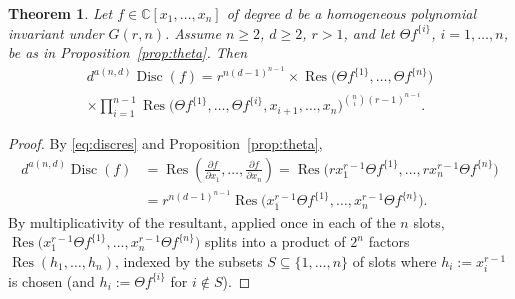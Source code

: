 \documentclass[12pt]{amsart}
\newtheorem{theorem}{Theorem}[section]
\theoremstyle{definition}
\newcommand{\Res}{\operatorname{Res}}
\newcommand{\Disc}{\operatorname{Disc}}
\begin{document}
\begin{theorem}
\label{thm:disc2}
Let $f \in \mathbb{C}[x_1,\dots,x_n]$ of degree $d$ be a homogeneous polynomial invariant under $G(r,n)$. Assume $n\geqslant 2$, $d\geqslant 2$, $r>1$, and let $\Theta f^{\{i\}}$, $i=1,\dots,n$, be as in Proposition~\ref{prop:theta}. Then
\begin{multline*}
d^{a(n,d)}\Disc(f) = r^{n(d-1)^{n-1}} \times \Res\big(\Theta f^{\{1\}},\dots,\Theta f^{\{n\}}\big) \\
\times \prod_{i=1}^{n-1} \Res\big(\Theta f^{\{1\}},\dots,\Theta f^{\{i\}}, x_{i+1},\dots,x_n\big)^{\binom{n}{i}(r-1)^{n-i}}.
\end{multline*}
\end{theorem}

\begin{proof}
By \eqref{eq:discres} and Proposition~\ref{prop:theta},
\begin{align*}
d^{a(n,d)}\Disc(f) &= \Res\left(\frac{\partial f}{\partial x_1},\dots,\frac{\partial f}{\partial x_n}\right) = \Res\big(rx_1^{r-1}\Theta f^{\{1\}},\dots,rx_n^{r-1}\Theta f^{\{n\}}\big) \\
&= r^{n(d-1)^{n-1}}\Res\big(x_1^{r-1}\Theta f^{\{1\}},\dots,x_n^{r-1}\Theta f^{\{n\}}\big).
\end{align*}
By multiplicativity of the resultant, applied once in each of the $n$ slots, $\Res\big(x_1^{r-1}\Theta f^{\{1\}},\dots,x_n^{r-1}\Theta f^{\{n\}}\big)$ splits into a product of $2^n$ factors $\Res(h_1,\dots,h_n)$, indexed by the subsets $S \subseteq \{1,\dots,n\}$ of slots where $h_i := x_i^{r-1}$ is chosen (and $h_i := \Theta f^{\{i\}}$ for $i \notin S$).


\end{proof}
\end{document}
